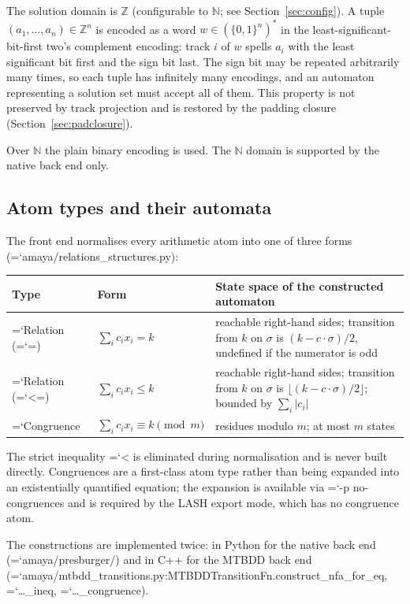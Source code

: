 \documentclass[10pt,a4paper]{article}
\newcommand{\code}[1]{{\small\ttfamily\hyphenchar\font=`\-\relax #1}}
\newcommand{\Nat}{\mathbb{N}}
\newcommand{\Int}{\mathbb{Z}}
\begin{document}
The solution domain is $\Int$ (configurable to $\Nat$; see Section~\ref{sec:config}).  A tuple
$(a_1,\dots,a_n) \in \Int^n$ is encoded as a word $w \in (\{0,1\}^n)^{*}$ in the
least-significant-bit-first two's complement encoding: track $i$ of $w$ spells $a_i$ with the least
significant bit first and the sign bit last.  The sign bit may be repeated arbitrarily many times, so
each tuple has infinitely many encodings, and an automaton representing a solution set must accept all
of them.  This property is not preserved by track projection and is restored by the padding closure
(Section~\ref{sec:padclosure}).

Over $\Nat$ the plain binary encoding is used.  The $\Nat$ domain is supported by the native back end
only.

\subsection{Atom types and their automata}

The front end normalises every arithmetic atom into one of three forms
(\code{amaya/relations\_structures.py}):

\begin{center}
\begin{tabular}{llp{72mm}}
\toprule
Type & Form & State space of the constructed automaton \\
\midrule
\code{Relation} (\code{=})  & $\sum_i c_i x_i = k$            & reachable right-hand sides; transition from $k$ on $\sigma$ is $(k - c\cdot\sigma)/2$, undefined if the numerator is odd \\
\code{Relation} (\code{<=}) & $\sum_i c_i x_i \leq k$          & reachable right-hand sides; transition from $k$ on $\sigma$ is $\lfloor (k - c\cdot\sigma)/2 \rfloor$; bounded by $\sum_i |c_i|$ \\
\code{Congruence}           & $\sum_i c_i x_i \equiv k \pmod m$ & residues modulo $m$; at most $m$ states \\
\bottomrule
\end{tabular}
\end{center}

The strict inequality \code{<} is eliminated during normalisation and is never built directly.
Congruences are a first-class atom type rather than being expanded into an existentially quantified
equation; the expansion is available via \code{-p no-congruences} and is required by the LASH export
mode, which has no congruence atom.

The constructions are implemented twice: in Python for the native back end
(\code{amaya/presburger/}) and in C++ for the MTBDD back end
(\code{amaya/mtbdd\_\allowbreak transitions.py:\allowbreak MTBDDTransitionFn.construct\_\allowbreak nfa\_\allowbreak for\_\allowbreak eq}, \code{\dots\_ineq},
\code{\dots\_congruence}).
\end{document}
